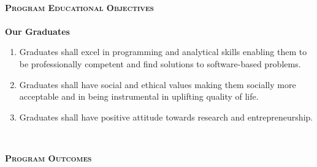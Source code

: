 \documentclass[10pt,a4paper]{report}
\begin{document}
\begin{center}
\begin{center}
\textsc{\normalsize\mdseries\upshape }\\
[0.50cm]
\textsc{\large\bfseries\upshape Program Educational Objectives}\\
\justify
\textsc{\large\bfseries }\\
[0.05cm]
\textbf{\large Our Graduates }\\
\begin{enumerate}
\item\large Graduates shall excel in programming and analytical skills enabling them to be professionally
competent and find solutions to software-based problems.
\vspace{0.3cm}
\item\large Graduates shall have social and ethical values making them socially more acceptable and in
being instrumental in uplifting quality of life.
\vspace{0.3cm}
\item\large Graduates shall have positive attitude towards research and entrepreneurship.


\end{enumerate}

\textsc{\large\bfseries }\\

\end{center}

\begin{center}

\textsc{\large\bfseries\upshape Program Outcomes}\\
\textsc{\large\bfseries }\\
[0.20cm]
\justify
\begin{enumerate}


\end{enumerate}
\end{center}
\end{center}
\end{document}
